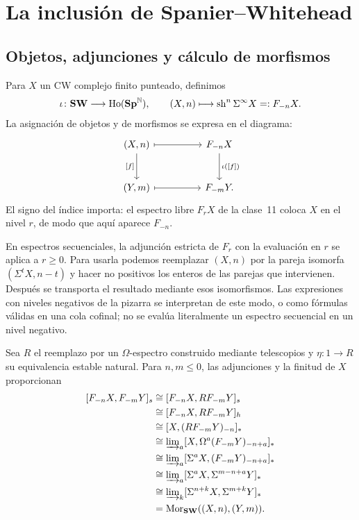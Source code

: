 \section{La inclusión de Spanier--Whitehead}

\subsection{Objetos, adjunciones y cálculo de morfismos}
Para $X$ un CW complejo finito punteado, definimos
\[
\iota\colon\mathbf{SW}\longrightarrow\operatorname{Ho}(\mathbf{Sp}^{\mathbb N}),
\qquad (X,n)\longmapsto\operatorname{sh}^n\Sigma^\infty X=:F_{-n}X.
\]
La asignación de objetos y de morfismos se expresa en el diagrama:
\[
\begin{tikzcd}[column sep=huge,row sep=large]
(X,n)\arrow[r,mapsto]\arrow[d,"{[f]}"']&F_{-n}X\arrow[d,"{\iota([f])}"]\\
(Y,m)\arrow[r,mapsto]&F_{-m}Y.
\end{tikzcd}
\]
El signo del índice importa: el espectro libre $F_rX$ de la clase~11 coloca $X$ en el nivel $r$, de modo que aquí aparece $F_{-n}$.
\begin{nota}\label{nota:c18-indices}
En espectros secuenciales, la adjunción estricta de $F_r$ con la evaluación en $r$ se aplica a $r\ge0$. Para usarla podemos reemplazar $(X,n)$ por la pareja isomorfa $(\Sigma^tX,n-t)$ y hacer no positivos los enteros de las parejas que intervienen. Después se transporta el resultado mediante esos isomorfismos. Las expresiones con niveles negativos de la pizarra se interpretan de este modo, o como fórmulas válidas en una cola cofinal; no se evalúa literalmente un espectro secuencial en un nivel negativo.
\end{nota}
Sea $R$ el reemplazo por un $\Omega$-espectro construido mediante telescopios y $\eta\colon1\to R$ su equivalencia estable natural. Para $n,m\le0$, las adjunciones y la finitud de $X$ proporcionan
\[
\begin{aligned}
[F_{-n}X,F_{-m}Y]_s
&\cong[F_{-n}X,RF_{-m}Y]_s\\
&\cong[F_{-n}X,RF_{-m}Y]_h\\
&\cong[X,(RF_{-m}Y)_{-n}]_*\\
&\cong\varinjlim\nolimits_a[X,\Omega^a(F_{-m}Y)_{-n+a}]_*\\
&\cong\varinjlim\nolimits_a[\Sigma^aX,(F_{-m}Y)_{-n+a}]_*\\
&\cong\varinjlim\nolimits_a[\Sigma^aX,\Sigma^{m-n+a}Y]_*\\
&\cong\varinjlim\nolimits_k[\Sigma^{n+k}X,\Sigma^{m+k}Y]_*\\
&=\hom_{\SW}((X,n),(Y,m)).
\end{aligned}
\]
